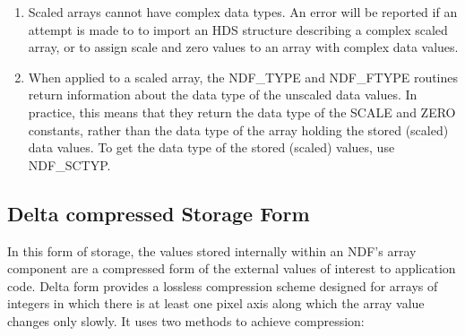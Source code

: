 \documentclass[twoside,11pt,nolof]{starlink}
\begin{document}
\begin{enumerate}
\item Scaled arrays cannot have complex data types. An error will be
reported if an attempt is made to to import an HDS structure describing a
complex scaled array, or to assign scale and zero values to an array with
complex data values.

\item When applied to a scaled array, the NDF\_TYPE and NDF\_FTYPE routines
return information about the data type of the unscaled data values. In
practice, this means that they return the data type of the SCALE and ZERO
constants, rather than the data type of the array holding the stored
(scaled) data values. To get the data type of the stored (scaled) values,
use NDF\_SCTYP.

\end{enumerate}


\subsection{\label{ss:deltaform}Delta compressed Storage Form}

In this form of storage, the values stored internally within an NDF's array
component are a compressed form of the external values of interest to
application code. Delta form provides a lossless compression scheme designed
for arrays of integers in which there is at least one pixel axis along which
the array value changes only slowly. It uses two methods to achieve
compression:
\end{document}

